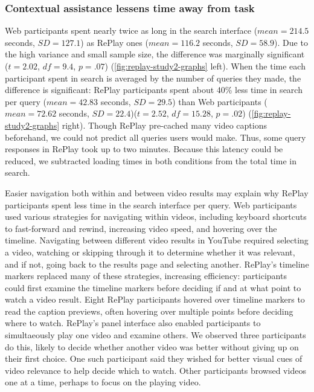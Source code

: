 
\subsubsection{Contextual assistance lessens time away from task}
Web participants spent nearly twice as long in the search interface ($mean\!=\!214.5$ seconds, $SD\!=\!127.1$) as RePlay ones ($mean\!=\!116.2$ seconds, $SD\!=\!58.9$). Due to the high variance and small sample size, the difference was marginally significant ($t\!=\!2.02$, $df\!=\!9.4$, $p\!=\!.07$) (\autoref{fig:replay-study2-graphs} left). When the time each participant spent in search is averaged by the number of queries they made, the difference is significant: RePlay participants spent about 40\% less time in search per query ($mean\!=\!42.83$ seconds, $SD\!=\!29.5$) than Web participants ($mean\!=\!72.62$ seconds, $SD\!=\!22.4$)($t\!=\!2.52$, $df\!=\!15.28$, $p\!=\!.02$) (\autoref{fig:replay-study2-graphs} right). Though RePlay pre-cached many video captions beforehand, we could not predict all queries users would make. Thus, some query responses in RePlay took up to two minutes. Because this latency could be reduced, we subtracted loading times in both conditions from the total time in search.

Easier navigation both within and between video results may explain why RePlay participants spent less time in the search interface per query. Web participants used various strategies for navigating within videos, including keyboard shortcuts to fast-forward and rewind, increasing video speed, and hovering over the timeline. Navigating between different video results in YouTube required selecting a video, watching or skipping through it to determine whether it was relevant, and if not, going back to the results page and selecting another. RePlay's timeline markers replaced many of these strategies, increasing efficiency: participants could first examine the timeline markers before deciding if and at what point to watch a video result. Eight RePlay participants hovered over timeline markers to read the caption previews, often hovering over multiple points before deciding where to watch. RePlay's panel interface also enabled participants to simultaeously play one video and examine others. We observed three participants do this, likely to decide whether another video was better without giving up on their first choice. One such participant said they wished for better visual cues of video relevance to help decide which to watch. Other participants browsed videos one at a time, perhaps to focus on the playing video.

